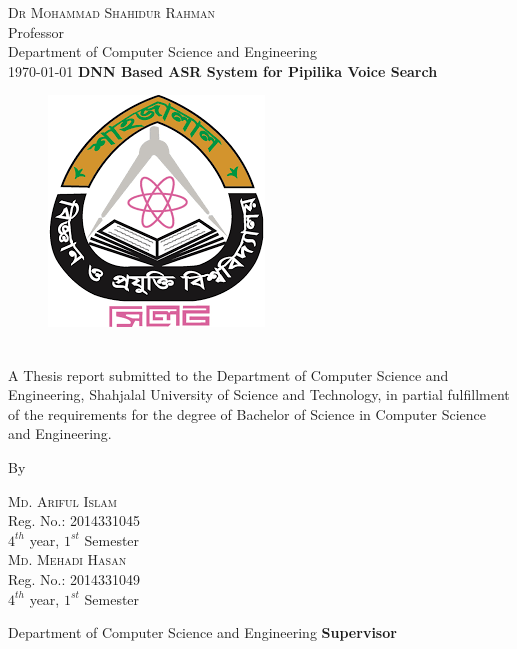 \documentclass{standalone}
\begin{document}
\begin{titlepage}
\begin{center}
                \textsc{\large Dr Mohammad Shahidur Rahman} \\
         Professor\\ 
				Department of Computer Science and Engineering\\
        \vfill
        \today
				\newpage
        {\Large \bf DNN Based ASR System for Pipilika Voice Search }
        \begin{figure}[h]
				\centering
				\includegraphics[scale=0.6]{./img/varsityLogo}
				\end{figure}\\
                
				A Thesis report submitted to the
Department of Computer Science and Engineering, 
Shahjalal University of Science and Technology, in partial fulfillment of the requirements for the degree of Bachelor of Science in Computer Science and Engineering.
       
				\vfill
				{\LARGE By}\\
        \begin{multicols}{2}
        
        \textsc{\large Md. Ariful Islam}\\
        Reg. No.: 2014331045\\ $4^{th}$ year, $1^{st}$ Semester\\
				
                \textsc{\large Md. Mehadi Hasan}\\
        Reg. No.: 2014331049\\ $4^{th}$ year, $1^{st}$ Semester\\ 
				\end{multicols}
				Department of Computer Science and Engineering
				\vfill
        {\bf Supervisor}\\
				

\end{center}
\end{titlepage}
\end{document}
